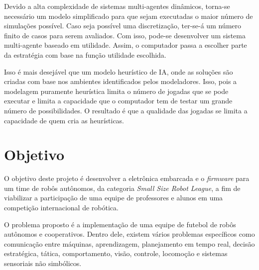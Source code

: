 Devido a alta complexidade de sistemas multi-agentes dinâmicos, torna-se
necessário um modelo simplificado para que sejam executadas o maior número de
simulações possível.  Caso seja possível uma discretização, ter-se-á um número
finito de casos para serem avaliados.  Com isso, pode-se desenvolver um sistema
multi-agente baseado em utilidade.  Assim, o computador passa a escolher parte
da estratégia com base na função utilidade escolhida.

Isso é mais desejável que um modelo heurístico de IA, onde as soluções são
criadas com base nos ambientes identificados pelos modeladores.  Isso, pois a
modelagem puramente heurística limita o número de jogadas que se pode executar e
limita a capacidade que o computador tem de testar um grande número de
possibilidades.  O resultado é que a qualidade das jogadas se limita a
capacidade de quem cria as heurísticas.

\section{Objetivo}
%


O objetivo deste projeto é desenvolver a eletrônica embarcada e o \textit{firmware} para um time de robôs autônomos, da categoria \textit{Small Size Robot League}, a fim de viabilizar a participação de uma equipe de professores e alunos em uma competição internacional de robótica.

O problema proposto é a implementação de uma equipe de futebol de robôs autônomos e cooperativos. Dentro dele, existem vários problemas específicos como comunicação entre máquinas, aprendizagem, planejamento em tempo real, decisão estratégica, tática, comportamento, visão, controle, locomoção e sistemas sensoriais não simbólicos. 


